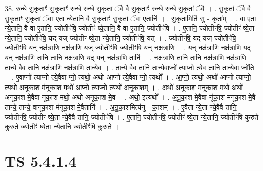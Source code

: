 \documentclass[17pt]{extarticle}
\begin{document}
38. रु॒न्धे॒ सु॒कृताꣳ॑ सु॒कृताꣳ॑ रुन्धे रुन्धे सु॒कृतां॒ ॅवै वै सु॒कृताꣳ॑ रुन्धे रुन्धे सु॒कृतां॒ ॅवै । . सु॒कृतां॒ ॅवै वै सु॒कृताꣳ॑ सु॒कृतां॒ ॅवा ए॒ता न्ये॒तानि॒ वै सु॒कृताꣳ॑ सु॒कृतां॒ ॅवा ए॒तानि॑ । . सु॒कृता॒मिति॑ सु - कृता᳚म् । . वा ए॒ता न्ये॒तानि॒ वै वा ए॒तानि॒ ज्योतीꣳ॑षि॒ ज्योतीꣳ॑ ष्ये॒तानि॒ वै वा ए॒तानि॒ ज्योतीꣳ॑षि । . ए॒तानि॒ ज्योतीꣳ॑षि॒ ज्योतीꣳ॑ ष्ये॒ता न्ये॒तानि॒ ज्योतीꣳ॑षि॒ यद् यज् ज्योतीꣳ॑ ष्ये॒ता न्ये॒तानि॒ ज्योतीꣳ॑षि॒ यत् । . ज्योतीꣳ॑षि॒ यद् यज् ज्योतीꣳ॑षि॒ ज्योतीꣳ॑षि॒ यन् नक्ष॑त्राणि॒ नक्ष॑त्राणि॒ यज् ज्योतीꣳ॑षि॒ ज्योतीꣳ॑षि॒ यन् नक्ष॑त्राणि । . यन् नक्ष॑त्राणि॒ नक्ष॑त्राणि॒ यद् यन् नक्ष॑त्राणि॒ तानि॒ तानि॒ नक्ष॑त्राणि॒ यद् यन् नक्ष॑त्राणि॒ तानि॑ । . नक्ष॑त्राणि॒ तानि॒ तानि॒ नक्ष॑त्राणि॒ नक्ष॑त्राणि॒ तान्ये॒ वैव तानि॒ नक्ष॑त्राणि॒ नक्ष॑त्राणि॒ तान्ये॒व । . तान्ये॒ वैव तानि॒ तान्ये॒वाप्नो᳚ त्याप्नो त्ये॒व तानि॒ तान्ये॒वा प्नो॑ति । . ए॒वाप्नो᳚ त्याप्नो त्ये॒वैवा प्नो॒ त्यथो॒ अथो॑ आप्नो त्ये॒वैवा प्नो॒ त्यथो᳚ । . आ॒प्नो॒ त्यथो॒ अथो॑ आप्नो त्याप्नो॒ त्यथो॑ अनूका॒श म॑नूका॒श मथो॑ आप्नो त्याप्नो॒ त्यथो॑ अनूका॒शम् । . अथो॑ अनूका॒श म॑नूका॒श मथो॒ अथो॑ अनूका॒श मे॒वैवा नू॑का॒श मथो॒ अथो॑ अनूका॒श मे॒व । . अथो॒ इत्यथो᳚ । . अ॒नू॒का॒श मे॒वैवा नू॑का॒श म॑नूका॒श मे॒वै तान्ये॒ तान्ये॒ वानू॑का॒श म॑नूका॒श मे॒वैतानि॑ । . अ॒नू॒का॒शमित्य॑नु - का॒शम् । . ए॒वैता न्ये॒ता न्ये॒वैवै तानि॒ ज्योतीꣳ॑षि॒ ज्योतीꣳ॑ ष्ये॒ता न्ये॒वैवै तानि॒ ज्योतीꣳ॑षि । . ए॒तानि॒ ज्योतीꣳ॑षि॒ ज्योतीꣳ॑ ष्ये॒ता न्ये॒तानि॒ ज्योतीꣳ॑षि कुरुते कुरुते॒ ज्योतीꣳ॑ ष्ये॒ता न्ये॒तानि॒ ज्योतीꣳ॑षि कुरुते । \newline
\pagebreak
{}

\section{ TS 5.4.1.4 }
\end{document}
